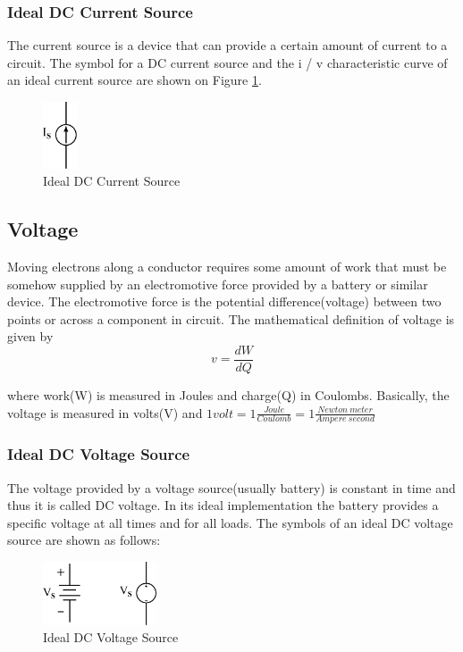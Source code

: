 \documentclass[a4 paper]{article}
\numberwithin{equation}{section}
\newcommand{\0}{\mathbf{0}}
\begin{document}
\subsubsection{Ideal DC Current Source}
The current source is a device that can provide a certain amount of current to a circuit. The symbol for a DC current source and the i / v characteristic curve of an ideal current source are shown on Figure \ref{currentsource}.
\begin{figure}[!ht]
  \caption{Ideal DC Current Source}
  \label{currentsource}
  \centering
  \includegraphics[width=0.09\textwidth]{./images/circuit1/current1}
\end{figure}




\subsection{Voltage}
Moving electrons along a conductor requires some amount of work that must be somehow supplied by an electromotive force provided by a battery or similar device. The electromotive force is the potential difference(voltage) between two points or across a component in circuit. The mathematical definition of voltage is given by
\begin{equation}
v = \frac{dW}{dQ} 
\end{equation}

where work(W) is measured in Joules and charge(Q) in Coulombs.
Basically, the voltage is measured in volts(V) and $1 volt = 1 \frac{Joule}{Coulomb} = 1 \frac{Newton \ meter}{Ampere \ second}$

\subsubsection{Ideal DC Voltage Source}
The voltage provided by a voltage source(usually battery) is constant in time and thus it is called DC voltage. In its ideal implementation the battery provides a specific voltage at all times and for all loads.
The symbols of an ideal DC voltage source are shown as follows:

\begin{figure}[!ht]
  \caption{Ideal DC Voltage Source}
  \centering
  \includegraphics[width=0.3\textwidth]{./images/circuit1/VoltageSource}
\end{figure}
\end{document}
